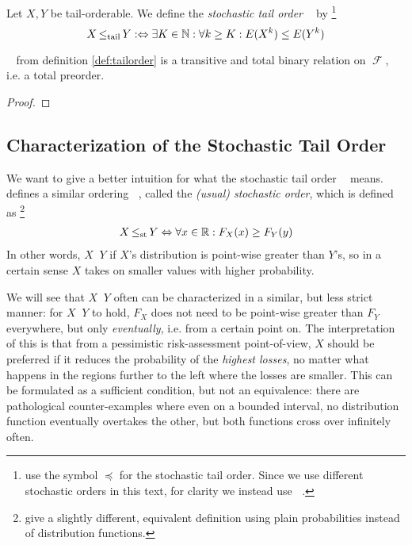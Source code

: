\documentclass[a4paper]{scrreprt}
\DeclareMathOperator{\leqst}{\leq_{\text{st}}}
\DeclareMathOperator{\leqtail}{\leq_{\text{tail}}}
\DeclareMathOperator{\F}{\mathcal{F}}
\begin{document}
    
    
    \begin{defn}
        Let $X, Y$ be tail-orderable. We define the \emph{stochastic tail order} $\leqtail$ by
        \footnote{\cite{bib:rassTotalOrderingOnLossDistributions,bib:rassGameRiskManagI} use the symbol $\preceq$ for the stochastic tail order. Since we use different stochastic orders in this text, for clarity we instead use $\leqtail$.}
        \[ X \leqtail Y :\lra \exists K \in \N: \forall k \geq K: E(X^k) \leq E(Y^k)\]
        \label{def:tailorder}
    \end{defn}
    
    \begin{lemma}
        $\leqtail$ from definition \ref{def:tailorder} is a transitive and total binary relation on $\F$, i.e. a total preorder.
    \end{lemma}
    \begin{proof}
    \end{proof}
    
    \subsection{Characterization of the Stochastic Tail Order}
    We want to give a better intuition for what the stochastic tail order $\leqtail$ means.
    \cite{bib:shakedStochasticOrders} defines a similar ordering $\leqst$, called the \emph{(usual) stochastic order}, which is defined as
    \footnote{\cite{bib:shakedStochasticOrders} give a slightly different, equivalent definition using plain probabilities instead of distribution functions.}
    \begin{gather}
        X \leqst Y \lra \forall x \in \R: F_X(x) \geq F_Y(y)
    \end{gather}
    In other words, $X \leqst Y$ if $X$'s distribution is point-wise greater than $Y$'s, so in a certain sense $X$ takes on smaller values with higher probability.
    
    We will see that $X \leqtail Y$ often can be characterized in a similar, but less strict manner: for $X \leqst Y$ to hold, $F_X$ does not need to be point-wise greater than $F_Y$ everywhere, but only \emph{eventually}, i.e. from a certain point on. The interpretation of this is that from a pessimistic risk-assessment point-of-view, $X$ should be preferred if it reduces the probability of the \emph{highest losses}, no matter what happens in the regions further to the left where the losses are smaller. This can be formulated as a sufficient condition, but not an equivalence: there are pathological counter-examples where even on a bounded interval, no distribution function eventually overtakes the other, but both functions cross over infinitely often.
    
\end{document}
